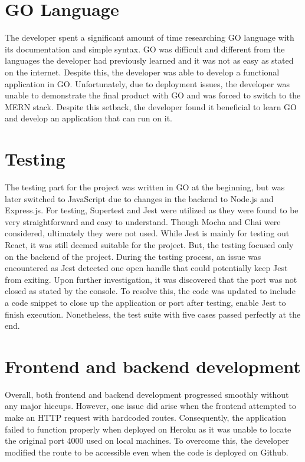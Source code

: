 \section{GO Language}
The developer spent a significant amount of time researching GO language with its documentation and simple syntax. GO was difficult and different from the languages the developer had previously learned and it was not as easy as stated on the internet. Despite this, the developer was able to develop a functional application in GO. Unfortunately, due to deployment issues, the developer was unable to demonstrate the final product with GO and was forced to switch to the MERN stack. Despite this setback, the developer found it beneficial to learn GO and develop an application that can run on it.

\section{Testing}
The testing part for the project was written in GO at the beginning, but was later switched to JavaScript due to changes in the backend to Node.js and Express.js. For testing, Supertest and Jest were utilized as they were found to be very straightforward and easy to understand. Though Mocha and Chai were considered, ultimately they were not used. While Jest is mainly for testing out React, it was still deemed suitable for the project. But, the testing focused only on the backend of the project. During the testing process, an issue was encountered as Jest detected one open handle that could potentially keep Jest from exiting. Upon further investigation, it was discovered that the port was not closed as stated by the console. To resolve this, the code was updated to include a code snippet to close up the application or port after testing, enable Jest to finish execution. Nonetheless, the test suite with five cases passed perfectly at the end.

\section{Frontend and backend development}
Overall, both frontend and backend development progressed smoothly without any major hiccups. However, one issue did arise when the frontend attempted to make an HTTP request with hardcoded routes. Consequently, the application failed to function properly when deployed on Heroku as it was unable to locate the original port 4000 used on local machines. To overcome this, the developer modified the route to be accessible even when the code is deployed on Github.
